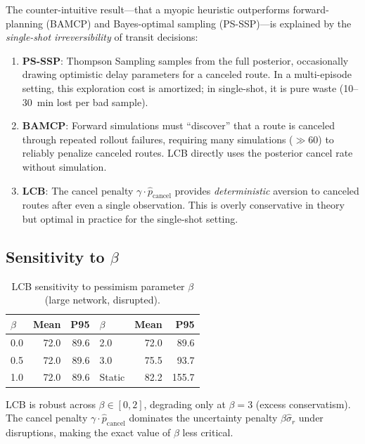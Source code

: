 \documentclass[journal]{IEEEtran}
\begin{document}
The counter-intuitive result---that a myopic heuristic outperforms forward-planning (BAMCP) and Bayes-optimal sampling (PS-SSP)---is explained by the \emph{single-shot irreversibility} of transit decisions:
\begin{enumerate}
    \item \textbf{PS-SSP}: Thompson Sampling samples from the full posterior, occasionally drawing optimistic delay parameters for a canceled route. In a multi-episode setting, this exploration cost is amortized; in single-shot, it is pure waste (10--30~min lost per bad sample).
    \item \textbf{BAMCP}: Forward simulations must ``discover'' that a route is canceled through repeated rollout failures, requiring many simulations ($\gg 60$) to reliably penalize canceled routes. LCB directly uses the posterior cancel rate without simulation.
    \item \textbf{LCB}: The cancel penalty $\gamma \cdot \hat{p}_{\mathrm{cancel}}$ provides \emph{deterministic} aversion to canceled routes after even a single observation. This is overly conservative in theory but optimal in practice for the single-shot setting.
\end{enumerate}

\subsection{Sensitivity to $\beta$}

\begin{table}[t]
\centering
\caption{LCB sensitivity to pessimism parameter $\beta$ (large network, disrupted).}
\label{tab:beta}
\begin{tabular}{lrr|lrr}
\toprule
$\beta$ & Mean & P95 & $\beta$ & Mean & P95 \\
\midrule
0.0 & 72.0 & 89.6 & 2.0 & 72.0 & 89.6 \\
0.5 & 72.0 & 89.6 & 3.0 & 75.5 & 93.7 \\
1.0 & 72.0 & 89.6 & Static & 82.2 & 155.7 \\
\bottomrule
\end{tabular}
\end{table}

LCB is robust across $\beta \in [0, 2]$, degrading only at $\beta = 3$ (excess conservatism). The cancel penalty $\gamma \cdot \hat{p}_{\mathrm{cancel}}$ dominates the uncertainty penalty $\beta \hat{\sigma}_r$ under disruptions, making the exact value of $\beta$ less critical.

\end{document}

